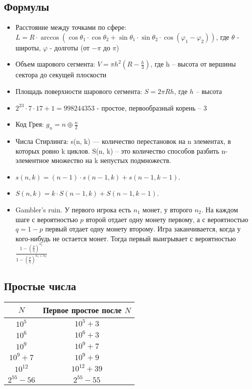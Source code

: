 \documentclass[14pt,fleqn]{article}
\begin{document}
	\subsection{Формулы}
	\begin{itemize}
		\item  Расстояние между точками по сфере: $L = R \cdot \arccos(\cos \theta_1 \cdot \cos \theta_2 + \sin \theta_1 \cdot \sin \theta_2 \cdot \cos(\varphi_1 - \varphi_2))$, где $\theta$ - широты, $\varphi$ - долготы (от $-\pi$ до $\pi$)
		\item Объем шарового сегмента: $V = \pi h^2(R - \frac{h}{3})$, где h – высота от вершины сектора до секущей плоскости
		\item Площадь поверхности шарового сегмента: $S = 2 \pi Rh$, где $h$ – высота
		\item $2^{23} \cdot 7 \cdot 17 + 1 = 998 244 353$ - простое, первообразный корень – 3
		\item Код Грея: $g_n = n \oplus \frac{n}{2}$
		\item Числа Стирлинга: s(n, k) — количество перестановок на n элементах, в которых ровно k циклов. S(n, k) – это количество способов разбить n-элементное множество на k непустых подмножеств.
		\item $s(n, k) = (n - 1) \cdot s(n - 1, k) + s(n - 1, k - 1)$.
		\item $S(n, k) = k \cdot S(n - 1, k) + S(n - 1, k - 1)$.
		\item Gambler’s ruin. У первого игрока есть $n_1$ монет, у второго $n_2$. На каждом шаге с вероятностью $p$ второй отдает одну монету первому, а с вероятностью $q = 1 - p$ первый отдает одну монету второму. Игра заканчивается,
		когда у кого-нибудь не остается монет. Тогда первый выигрывает с вероятностью $\frac{1 - \left(\frac{p}{q}\right)^{n_1}}{1 - \left(\frac{p}{q}\right)^{n_1 + n_2}}$
	\end{itemize}
	\subsection{Простые числа}
	\begin{tabular}{|c|c|}
		\hline  $N$ & Первое простое после $N$\\ 
		\hline $10^5$ & $10^5 + 3$ \\
		\hline $10^6$ & $10^6 + 3$ \\
		\hline $10^9$ & $10^9 + 7$ \\
		\hline $10^9 + 7$ & $10^9 + 9$ \\
		\hline $10^{12}$ & $10^{12} + 39$ \\
		\hline $2^{55} - 56$ & $2^{55} -55$ \\
		\hline
	\end{tabular}
\end{document}
